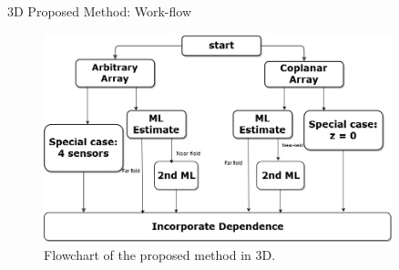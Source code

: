 \documentclass[10pt]{beamer}
\begin{document}
\begin{frame}{3D Proposed Method: Work-flow}

  \begin{figure}
    \centering
    \includegraphics[width=0.9\textwidth]{img/workflow.png}
    \caption{Flowchart of the proposed method in 3D.}
  \end{figure}
\end{frame}
\end{document}
